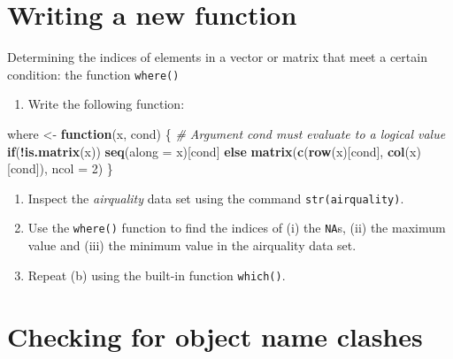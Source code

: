 \documentclass[
]{book}
\newenvironment{Shaded}{\begin{snugshade}}{\end{snugshade}}
\newcommand{\AttributeTok}[1]{\textcolor[rgb]{0.13,0.29,0.53}{#1}}
\newcommand{\CommentTok}[1]{\textcolor[rgb]{0.56,0.35,0.01}{\textit{#1}}}
\newcommand{\ControlFlowTok}[1]{\textcolor[rgb]{0.13,0.29,0.53}{\textbf{#1}}}
\newcommand{\DecValTok}[1]{\textcolor[rgb]{0.00,0.00,0.81}{#1}}
\newcommand{\FunctionTok}[1]{\textcolor[rgb]{0.13,0.29,0.53}{\textbf{#1}}}
\newcommand{\NormalTok}[1]{#1}
\newcommand{\OtherTok}[1]{\textcolor[rgb]{0.56,0.35,0.01}{#1}}
\newcommand{\SpecialCharTok}[1]{\textcolor[rgb]{0.81,0.36,0.00}{\textbf{#1}}}
\providecommand{\tightlist}{%
  \setlength{\itemsep}{0pt}\setlength{\parskip}{0pt}}
\begin{document}
\section{Writing a new function}\label{writing-a-new-function}

Determining the indices of elements in a vector or matrix that meet a certain condition: the function \texttt{where()}

\begin{enumerate}
\def\labelenumi{(\alph{enumi})}
\tightlist
\item
  Write the following function:
\end{enumerate}

\begin{Shaded}
\begin{Highlighting}[]
\NormalTok{where }\OtherTok{\textless{}{-}} \ControlFlowTok{function}\NormalTok{(x, cond)}
\NormalTok{\{ }\CommentTok{\# Argument cond must evaluate to a logical value}
     \ControlFlowTok{if}\NormalTok{(}\SpecialCharTok{!}\FunctionTok{is.matrix}\NormalTok{(x))}
       \FunctionTok{seq}\NormalTok{(}\AttributeTok{along =}\NormalTok{ x)[cond]}
     \ControlFlowTok{else} \FunctionTok{matrix}\NormalTok{(}\FunctionTok{c}\NormalTok{(}\FunctionTok{row}\NormalTok{(x)[cond], }\FunctionTok{col}\NormalTok{(x)[cond]), }\AttributeTok{ncol =} \DecValTok{2}\NormalTok{)}
\NormalTok{\}}
\end{Highlighting}
\end{Shaded}

\begin{enumerate}
\def\labelenumi{(\alph{enumi})}
\setcounter{enumi}{1}
\item
  Inspect the \emph{airquality} data set using the command \texttt{str(airquality)}.
\item
  Use the \texttt{where()} function to find the indices of (i) the \texttt{NA}s, (ii) the maximum value and (iii) the minimum value in the airquality data set.
\item
  Repeat (b) using the built-in function \texttt{which()}.
\end{enumerate}

\section{Checking for object name clashes}\label{checking-for-object-name-clashes}
\end{document}
